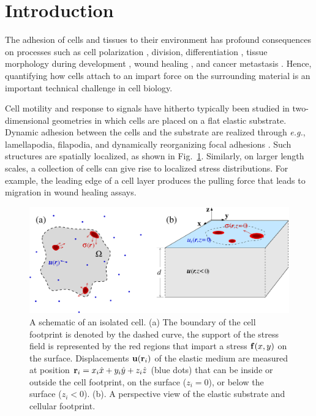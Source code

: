 \documentclass[aps,prl,reprint,twocolumn,groupedaddress,showpacs]{revtex4}
\def\r{{\bf r}}
\begin{document}
\section{Introduction}

The adhesion of cells and tissues to their environment has profound
consequences on processes such as cell polarization \cite{MASHA2011},
division, differentiation \cite{DIFFERENTIATION0}, tissue morphology
during development \cite{DEVELOPMENT0}, wound healing
\cite{WOUND0,WOUND2,WOUND1}, and cancer metastasis
\cite{CANCER0}. Hence, quantifying how cells attach to an impart force
on the surrounding material is an important technical challenge in
cell biology.

Cell motility and response to signals have hitherto typically been
studied in two-dimensional geometries in which cells are placed on a
flat elastic substrate.  Dynamic adhesion between the cells and the
substrate are realized through {\it e.g.}, lamellapodia, filapodia,
and dynamically reorganizing focal adhesions \cite{MBOC}.  Such structures are
spatially localized, as shown in Fig.~\ref{FIG1}. Similarly, on larger
length scales, a collection of cells can give rise to localized stress
distributions. For example, the leading edge of a cell layer produces
the pulling force that leads to migration in wound healing assays.

\begin{figure}[t]
\begin{center}
\includegraphics[width=\linewidth]{Fig1.pdf}
\caption{A schematic of an isolated cell. (a) The boundary of the cell
  footprint is denoted by the dashed curve, the support of the stress
  field is represented by the red regions that impart a stress ${\bf
    f}(x,y)$ on the surface. Displacements ${\bf u}(\r_{i})$ of the
  elastic medium are measured at position $\r_{i} =
  x_{i}\hat{x}+y_{i}\hat{y}+z_{i}\hat{z}$ (blue dots) that can be
  inside or outside the cell footprint, on the surface ($z_{i}=0$), or
  below the surface ($z_{i}<0$). (b). A perspective view of the
  elastic substrate and cellular footprint.}
\label{FIG1}
\end{center}
\end{figure}
\end{document}
